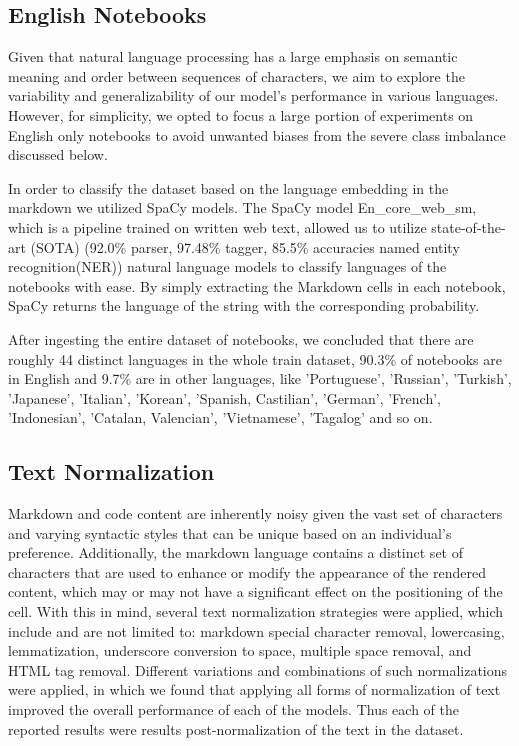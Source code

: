 \documentclass[conference]{IEEEtran}
\begin{document}
\subsection{English Notebooks}
Given that natural language processing has a large emphasis on semantic meaning and order between sequences of characters, we aim to explore the variability and generalizability of our model’s performance in various languages. However, for simplicity, we opted to focus a large portion of experiments on English only notebooks to avoid unwanted biases from the severe class imbalance discussed below.

In order to classify the dataset based on the language embedding in the markdown we utilized SpaCy models. The SpaCy model En\_core\_web\_sm, which is a pipeline trained on written web text, allowed us to utilize state-of-the-art (SOTA)  (92.0\% parser, 97.48\% tagger, 85.5\% accuracies named entity recognition(NER)) natural language models to classify languages of the  notebooks with ease.  By simply extracting the Markdown cells in each notebook, SpaCy returns the language of the string with the corresponding probability.


After ingesting the entire dataset of notebooks, we concluded that there are roughly 44 distinct languages in the whole train dataset, 90.3\% of notebooks are in English and 9.7\% are in other languages, like 'Portuguese', 'Russian', 'Turkish', 'Japanese', 'Italian', 'Korean', 'Spanish, Castilian', 'German', 'French', 'Indonesian', 'Catalan, Valencian', 'Vietnamese', 'Tagalog’ and so on.


\subsection{Text Normalization}
Markdown and code content are inherently noisy given the vast set of characters and varying syntactic styles that can be unique based on an individual’s preference. Additionally, the markdown language contains a distinct set of characters that are used to enhance or modify the appearance of the rendered content, which may or may not have a significant effect on the positioning of the cell.  With this in mind, several text normalization strategies were applied, which include and are not limited to: markdown special character removal, lowercasing, lemmatization, underscore conversion to space, multiple space removal, and HTML tag removal. Different variations and combinations of such normalizations were applied, in which we found that applying all forms of normalization of text improved the overall performance of each of the models. Thus each of the reported results were results post-normalization of the text in the dataset.
\end{document}
